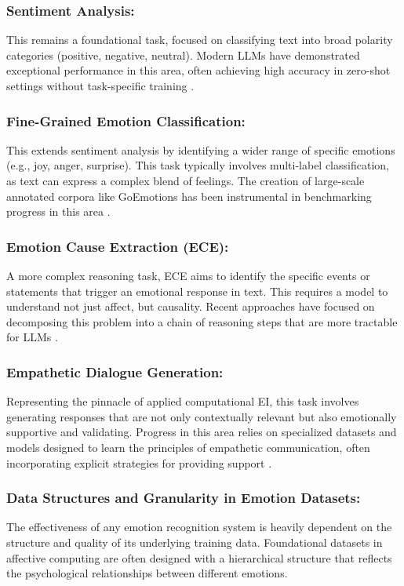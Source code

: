 \subsubsection{Sentiment Analysis:}  This remains a foundational task, focused on classifying text into broad polarity categories (positive, negative, neutral). Modern LLMs have demonstrated exceptional performance in this area, often achieving high accuracy in zero-shot settings without task-specific training \cite{amin2023affective}.

\subsubsection{Fine-Grained Emotion Classification:}  This extends sentiment analysis by identifying a wider range of specific emotions (e.g., joy, anger, surprise). This task typically involves multi-label classification, as text can express a complex blend of feelings. The creation of large-scale annotated corpora like GoEmotions has been instrumental in benchmarking progress in this area \cite{demszky2020goemotions}.

\subsubsection{Emotion Cause Extraction (ECE):}  A more complex reasoning task, ECE aims to identify the specific events or statements that trigger an emotional response in text. This requires a model to understand not just affect, but causality. Recent approaches have focused on decomposing this problem into a chain of reasoning steps that are more tractable for LLMs \cite{wu2024decc}.

\subsubsection{Empathetic Dialogue Generation:}  Representing the pinnacle of applied computational EI, this task involves generating responses that are not only contextually relevant but also emotionally supportive and validating. Progress in this area relies on specialized datasets and models designed to learn the principles of empathetic communication, often incorporating explicit strategies for providing support \cite{liu2021esconv}.

\subsubsection{Data Structures and Granularity in Emotion Datasets:} 
The effectiveness of any emotion recognition system is heavily dependent on the structure and quality of its underlying training data. Foundational datasets in affective computing are often designed with a hierarchical structure that reflects the psychological relationships between different emotions.

